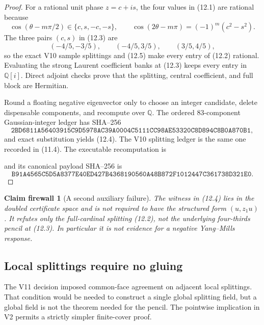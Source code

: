 \documentclass[11pt,oneside]{article}
\newtheorem{firewall}[theorem]{Claim firewall}
\theoremstyle{definition}
\theoremstyle{remark}
\begin{document}
\begin{proof}
For a rational unit phase \(z=c+is\), the four values in (12.1) are
rational because
\[
 \cos(\theta-m\pi/2)\in\{c,s,-c,-s\},\qquad
 \cos(2\theta-m\pi)=(-1)^m(c^2-s^2).                     \tag{12.5}
\]
The three pairs \((c,s)\) in (12.3) are
\[
 (-4/5,-3/5),\qquad(-4/5,3/5),\qquad(3/5,4/5),
\]
so the exact V10 sample splittings and (12.5) make every entry of
(12.2) rational.  Evaluating the strong Laurent coefficient banks at
(12.3) keeps every entry in \(\mathbb Q[i]\).  Direct adjoint checks
prove that the splitting, central coefficient, and full block are
Hermitian.

Round a floating negative eigenvector only to choose an integer
candidate, delete dispensable components, and recompute over
\(\mathbb Q\).  The ordered \(83\)-component Gaussian-integer ledger
has SHA--256
\[
\texttt{2BD6811A56403915C9D5978AC39A0004C5111CC98AE53320C8D894C8B0A870B1},
                                                               \tag{12.6}
\]
and exact substitution yields (12.4).  The V10 splitting ledger is
the same one recorded in (11.4).  The executable recomputation is
\begin{center}
\footnotesize
{}
\end{center}
and its canonical payload SHA--256 is
\[
\texttt{B91A4565C5D5A8377E40ED427B4368190560A48B872F1012447C361738D321E0}.
                                                               \tag{12.7}
\]
\end{proof}

\begin{firewall}[A second auxiliary failure]
\label{fire:newv12-auxiliary}
The witness in (12.4) lies in the doubled certificate space and is
not required to have the structured form \((u,z_1u)\).  It refutes
only the full-cardinal splitting (12.2), not the underlying
four-thirds pencil at (12.3).  In particular it is not evidence for a
negative Yang--Mills response.
\end{firewall}

\subsection{Local splittings require no gluing}

The V11 decision imposed common-face agreement on adjacent local
splittings.  That condition would be needed to construct a single
global splitting field, but a global field is not the theorem needed
for the pencil.  The pointwise implication in V2 permits a strictly
simpler finite-cover proof.
\end{document}
